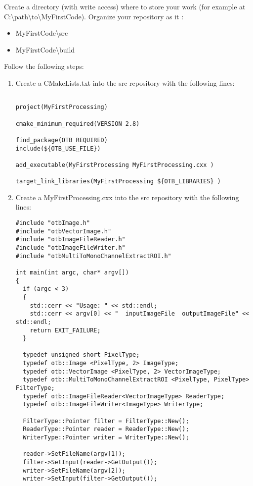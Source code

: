 Create a directory (with write access) where to store your work (for example at C:\textbackslash path\textbackslash to\textbackslash MyFirstCode).
Organize your repository as it :
\begin{itemize}
\item MyFirstCode\textbackslash src
\item MyFirstCode\textbackslash build
\end{itemize}

Follow the following steps:
\begin{enumerate}
\item Create a CMakeLists.txt into the src repository with the following lines:


\begin{verbatim}

project(MyFirstProcessing)

cmake_minimum_required(VERSION 2.8)

find_package(OTB REQUIRED)
include(${OTB_USE_FILE})

add_executable(MyFirstProcessing MyFirstProcessing.cxx )

target_link_libraries(MyFirstProcessing ${OTB_LIBRARIES} )
\end{verbatim}

\item Create a MyFirstProcessing.cxx into the src repository with the following lines:
\begin{verbatim}
#include "otbImage.h"
#include "otbVectorImage.h"
#include "otbImageFileReader.h"
#include "otbImageFileWriter.h"
#include "otbMultiToMonoChannelExtractROI.h"

int main(int argc, char* argv[])
{
  if (argc < 3)
  {
    std::cerr << "Usage: " << std::endl;
    std::cerr << argv[0] << "  inputImageFile  outputImageFile" << std::endl;
    return EXIT_FAILURE;
  }

  typedef unsigned short PixelType;
  typedef otb::Image <PixelType, 2> ImageType;
  typedef otb::VectorImage <PixelType, 2> VectorImageType;
  typedef otb::MultiToMonoChannelExtractROI <PixelType, PixelType> FilterType;
  typedef otb::ImageFileReader<VectorImageType> ReaderType;
  typedef otb::ImageFileWriter<ImageType> WriterType;

  FilterType::Pointer filter = FilterType::New();
  ReaderType::Pointer reader = ReaderType::New();
  WriterType::Pointer writer = WriterType::New();

  reader->SetFileName(argv[1]);
  filter->SetInput(reader->GetOutput());
  writer->SetFileName(argv[2]);
  writer->SetInput(filter->GetOutput());


\end{verbatim}
\end{enumerate}
